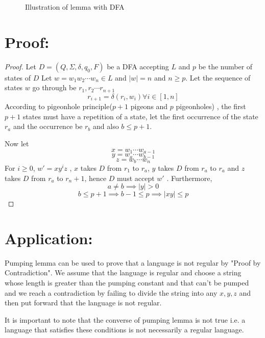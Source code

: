 \documentclass{article}
\begin{document}
\begin{figure}[ht] %
\centering %
\caption{Illustration of lemma with DFA}
\label{fig:my_label}
\end{figure}


\section{Proof:}
\begin{proof}
Let $D=(Q,\Sigma, \delta, q_0,F)$ be a DFA accepting $L$ and $p$ be the number of states of $D$
Let $w=w_1w_2\cdots w_n\in L$ and  $\mid w\mid =n$ and $n\ge p$.
Let the sequence of states $w$ go through be $r_1,r_2\cdots r_{n+1}$
$$r_{i+1}=\delta(r_i,w_i)\forall i\in [1,n]$$
According to pigeonhole principle($p+1$ pigeons and $p$ pigeonholes) , the first $p+1$ states must have a repetition of a state, let the first occurrence of the state $r_a$ and the occurrence be $r_b$ and also $b\le p+1$. 

Now let $$x=w_1\cdots w_{a-1}$$ $$y=w_a\cdots w_{b-1}$$ $$z=w_b\cdots w_n$$
For $i\ge0$, $w'=xy^iz$ , $x$ takes $D$ from $r_1$ to $r_a$, $y$ takes $D$ from $r_a$ to $r_a$ and $z$ takes $D$ from $r_a$ to $r_n+1$, hence $D$ must accept $w'$ . Furthermore,
$$a\ne b\implies \mid y\mid>0$$
$$b\le p+1\implies b-1\le p \implies \mid xy\mid \le p$$
\end{proof}

\section{Application:}
Pumping lemma can be used to prove that a language is not regular by "Proof by Contradiction". We assume that the language is regular and choose a string whose length is greater than the pumping constant and that can't be pumped and we reach a contradiction by failing to divide the string into any $x,y,z$ and then put forward that the language is not regular.

It is important to note that the converse of pumping lemma is not true i.e. a language that satisfies these conditions is not necessarily a regular language.
\end{document}
